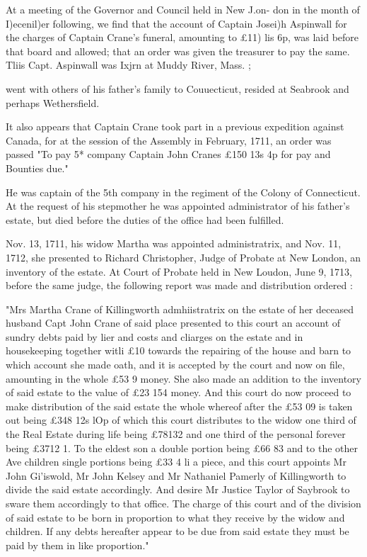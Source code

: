 \documentclass{book}
\begin{document}
At a meeting of the Governor and Council held in New J.on- 
don in the month of I)ecenil)er following, we find that the account 
of Captain Josei)h Aspinwall for the charges of Captain Crane's 
funeral, amounting to £11)  lis  6p, was laid before that board 
and allowed; that an order was given the treasurer to pay the 
same. Tliis Capt. Aspinwall was Ixjrn at Muddy River, Mass. ; 




went with others of his father's family to Couuecticut, resided at 
Seabrook and perhaps Wethersfield. 

It also appears that Captain Crane took part in a previous 
expedition against Canada, for at the session of the Assembly in 
February, 1711, an order was passed "To pay 5* company 
Captain John Cranes £150  13s  4p for pay and Bounties due." 

He was captain of the 5th company in the regiment of the 
Colony of Connecticut. At the request of his stepmother he was 
appointed administrator of his father's estate, but died before the 
duties of the office had been fulfilled. 

Nov. 13, 1711, his widow Martha was appointed administratrix, 
and Nov. 11, 1712, she presented to Richard Christopher, Judge 
of Probate at New London, an inventory of the estate. At Court 
of Probate held in New Loudon, June 9, 1713, before the same 
judge, the following report was made and distribution ordered : 

"Mrs Martha Crane of Killingworth admhiistratrix on the estate of 
her deceased husband Capt John Crane of said place presented to this 
court an account of sundry debts paid by lier and costs and cliarges on 
the estate and in housekeeping together witli £10 towards the repairing 
of the house and barn to which account she made oath, and it is accepted 
by the court and now on file, amounting in the whole £53   9 money. 
She also made an addition to the inventory of said estate to the value of 
£23  154 money. And this court do now proceed to make distribution 
of the said estate the whole whereof after the £53  09 is taken out 
being £348  12s  lOp of which this court distributes to the widow one 
third of the Real Estate during life being £78132 and one third of the 
personal forever being £3712  1. To the eldest son a double portion 
being £66  83 and to the other Ave children single portions being 
£33 4 li a piece, and this court appoints Mr John Gi'iswold, Mr John 
Kelsey and Mr Nathaniel Pamerly of Killingworth to divide the said 
estate accordingly. And desire Mr Justice Taylor of Saybrook to sware 
them accordingly to that office. The charge of this court and of the 
division of said estate to be born in proportion to what they receive by 
the widow and children. If any debts hereafter appear to be due from 
said estate they must be paid by them in like proportion." 
\end{document}
